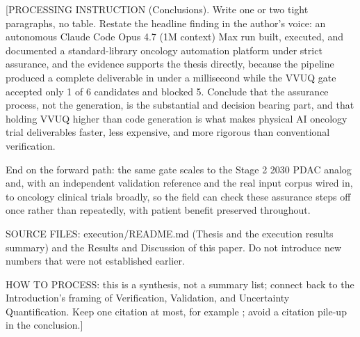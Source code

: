 
[PROCESSING INSTRUCTION (Conclusions). Write one or two tight paragraphs,
no table. Restate the headline finding in the author's voice: an
autonomous Claude Code Opus 4.7 (1M context) Max run built, executed, and
documented a standard-library oncology automation platform under strict
assurance, and the evidence supports the thesis directly, because the
pipeline produced a complete deliverable in under a millisecond while the
VVUQ gate accepted only 1 of 6 candidates and blocked 5. Conclude that the
assurance process, not the generation, is the substantial and decision
bearing part, and that holding VVUQ higher than code generation is what
makes physical AI oncology trial deliverables faster, less expensive, and
more rigorous than conventional verification.

End on the forward path: the same gate scales to the Stage 2 2030 PDAC
analog and, with an independent validation reference and the real input
corpus wired in, to oncology clinical trials broadly, so the field can
check these assurance steps off once rather than repeatedly, with patient
benefit preserved throughout.

SOURCE FILES: execution/README.md (Thesis and the execution results
summary) and the Results and Discussion of this paper. Do not introduce
new numbers that were not established earlier.

HOW TO PROCESS: this is a synthesis, not a summary list; connect back to
the Introduction's framing of Verification, Validation, and Uncertainty
Quantification. Keep one citation at most, for example
\cite{repo-cancer-automated}; avoid a citation pile-up in the conclusion.]
